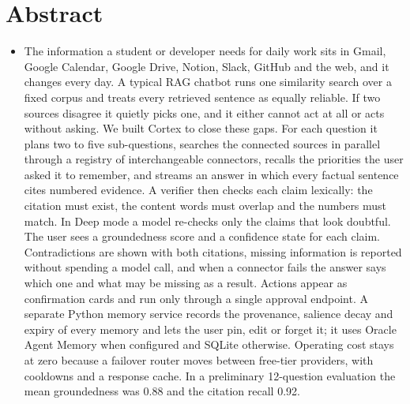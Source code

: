 \documentclass[oneside,a4paper,12pt]{report}
\begin{document}
\section{Abstract}
\begin{itemize}
	\item The information a student or developer needs for daily work sits in Gmail, Google Calendar, Google Drive, Notion, Slack, GitHub and the web, and it changes every day. A typical RAG chatbot runs one similarity search over a fixed corpus and treats every retrieved sentence as equally reliable. If two sources disagree it quietly picks one, and it either cannot act at all or acts without asking. We built Cortex to close these gaps. For each question it plans two to five sub-questions, searches the connected sources in parallel through a registry of interchangeable connectors, recalls the priorities the user asked it to remember, and streams an answer in which every factual sentence cites numbered evidence. A verifier then checks each claim lexically: the citation must exist, the content words must overlap and the numbers must match. In Deep mode a model re-checks only the claims that look doubtful. The user sees a groundedness score and a confidence state for each claim. Contradictions are shown with both citations, missing information is reported without spending a model call, and when a connector fails the answer says which one and what may be missing as a result. Actions appear as confirmation cards and run only through a single approval endpoint. A separate Python memory service records the provenance, salience decay and expiry of every memory and lets the user pin, edit or forget it; it uses Oracle Agent Memory when configured and SQLite otherwise. Operating cost stays at zero because a failover router moves between free-tier providers, with cooldowns and a response cache. In a preliminary 12-question evaluation the mean groundedness was 0.88 and the citation recall 0.92.
\end{itemize}
\end{document}
